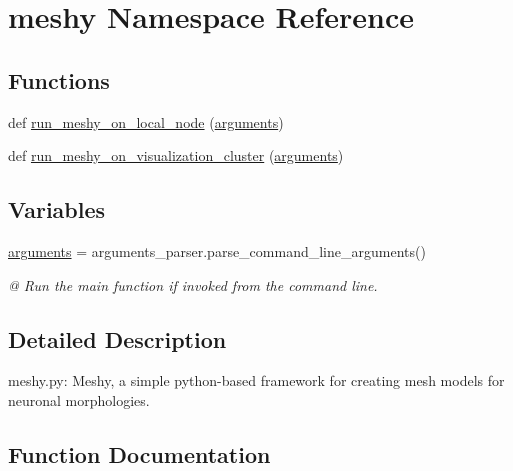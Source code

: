 \hypertarget{namespacemeshy}{}\section{meshy Namespace Reference}
\label{namespacemeshy}
\subsection*{Functions}
\begin{DoxyCompactItemize}
\item 
def \hyperlink{namespacemeshy_a881ff571440e544a53ff176b319fb73f}{run\+\_\+meshy\+\_\+on\+\_\+local\+\_\+node} (\hyperlink{namespacemeshy_a307b1e345e459700c6baa2aaa382d411}{arguments})
\item 
def \hyperlink{namespacemeshy_afd456c15ea4214edc94ff90007266525}{run\+\_\+meshy\+\_\+on\+\_\+visualization\+\_\+cluster} (\hyperlink{namespacemeshy_a307b1e345e459700c6baa2aaa382d411}{arguments})
\end{DoxyCompactItemize}
\subsection*{Variables}
\begin{DoxyCompactItemize}
\item 
\hyperlink{namespacemeshy_a307b1e345e459700c6baa2aaa382d411}{arguments} = arguments\+\_\+parser.\+parse\+\_\+command\+\_\+line\+\_\+arguments()\hypertarget{namespacemeshy_a307b1e345e459700c6baa2aaa382d411}{}\label{namespacemeshy_a307b1e345e459700c6baa2aaa382d411}

\begin{DoxyCompactList}\small\item\em @ Run the main function if invoked from the command line. \end{DoxyCompactList}\end{DoxyCompactItemize}


\subsection{Detailed Description}
\begin{DoxyVerb}meshy.py:
Meshy, a simple python-based framework for creating mesh models for neuronal morphologies.
\end{DoxyVerb}
 

\subsection{Function Documentation}
